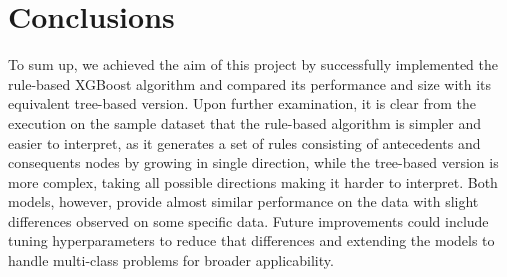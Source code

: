\documentclass{article}
\begin{document}
\section{Conclusions}
To sum up, we achieved the aim of this project by successfully implemented the rule-based XGBoost algorithm and compared its performance and size with its equivalent tree-based version. Upon further examination, it is clear from the execution on the sample dataset that the rule-based algorithm is simpler and easier to interpret, as it generates a set of rules consisting of antecedents and consequents nodes by growing in single direction, while the tree-based version is more complex, taking all possible directions making it harder to interpret. Both models, however, provide almost similar performance on the data with slight differences observed on some specific data. Future improvements could include tuning hyperparameters to reduce that differences and extending the models to handle multi-class problems for broader applicability.



\end{document}
